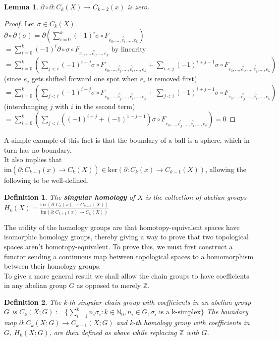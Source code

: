 \documentclass{report}
\newtheorem{definition}{Definition}
\newtheorem{lemma}{Lemma}
\begin{document}
\begin{lemma}
$\partial\circ\partial\colon C_k(X)\to C_{k-2}(x)$ is zero.
\end{lemma}
\begin{proof}
Let $\sigma\in C_k(X)$.\\
$\partial\circ\partial (\sigma)=\partial(\sum_{i=0}^k(-1)^i\sigma\circ F_{e_0,...,\overset{\wedge}{e_i},...,e_k})$\\
$=\sum_{i=0}^k(-1)^i\partial\circ\sigma\circ F_{e_0,...,\overset{\wedge}{e_i},...,e_k}$ by linearity\\
$=\sum_{i=0}^k(\sum_{j<i}(-1)^{i+j}\sigma\circ F_{e_0,...,\overset{\wedge}{e_j},...,\overset{\wedge}{e_i},...,e_k} + \sum_{i<j}(-1)^{i+j-1}\sigma\circ F_{e_0,...,\overset{\wedge}{e_i},...,\overset{\wedge}{e_j},...,e_k})$ (since $e_j$ gets shifted forward one spot when $e_i$ is removed first)\\
$=\sum_{i=0}^k(\sum_{j<i}(-1)^{i+j}\sigma\circ F_{e_0,...,\overset{\wedge}{e_j},...,\overset{\wedge}{e_i},...,e_k} + \sum_{j<i}(-1)^{i+j-1}\sigma\circ F_{e_0,...,\overset{\wedge}{e_j},...,\overset{\wedge}{e_i},...,e_k})$
(interchanging $j$ with $i$ in the second term)\\
$=\sum_{i=0}^k(\sum_{j<i}((-1)^{i+j}+(-1)^{1+j-1})\sigma\circ F_{e_0,...,\overset{\wedge}{e_j},...,\overset{\wedge}{e_i},...,e_k})=0$
\end{proof}

\noindent A simple example of this fact is that the boundary of a ball is a sphere, which in turn has no boundary.\\
It also implies that $\text{im}(\partial:C_{k+1}(x)\rightarrow C_k(X))\in\text{ker}(\partial:C_{k}(x)\rightarrow C_{k-1}(X))$,
allowing the following to be well-defined.
\begin{definition}
The \textbf{singular homology} of $X$ is the collection of abelian groups
$H_k(X)=\frac{\text{ker}(\partial:C_{k}(x)\rightarrow C_{k-1}(X))}{\text{im}(\partial:C_{k+1}(x)\rightarrow C_k(X))}$
\end{definition}

\noindent The utility of the homology groups are that homotopy-equivalent spaces have isomorphic homology groups, thereby giving a way to prove that two topological spaces aren't homotopy-equivalent. To prove this, we must first construct a functor sending a continuous map between topological spaces to a homomorphism between their homology groups.\\

\noindent To give a more general result we shall allow the chain groups to have coefficients in any abelian group $G$ as opposed to merely $\mathbb{Z}$.
\begin{definition}
The k-th singular chain group with coefficients in an abelian group $G$ is $C_k(X;G):=\{\sum_{i=1}^kn_i\sigma_i:k\in\mathbb{N}_0,n_i\in G,\sigma_i \text{ is a k-simplex}\}$ The boundary map $\partial\colon C_k(X;G)\to C_{k-1}(X;G)$ and k-th homology group with coefficients in $G$, $H_k(X;G)$, are then defined as above while replacing $\mathbb{Z}$ with $G$.
\end{definition}
\end{document}
